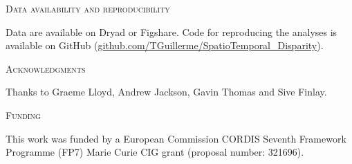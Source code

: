 \documentclass[12pt,letterpaper]{article}
\renewcommand{\section}[1]{%
\bigskip
\begin{center}
\begin{Large}
\normalfont\scshape #1
\medskip
\end{Large}
\end{center}}
\begin{document}


\section{Data availability and reproducibility}
Data are available on Dryad or Figshare.
Code for reproducing the analyses is available on GitHub (\url{github.com/TGuillerme/SpatioTemporal_Disparity}).

\section{Acknowledgments}
Thanks to Graeme Lloyd, Andrew Jackson, Gavin Thomas and Sive Finlay.%

\section{Funding} %
This work was funded by a European Commission CORDIS Seventh Framework Programme (FP7) Marie Curie CIG grant (proposal number: 321696).

\end{document}
